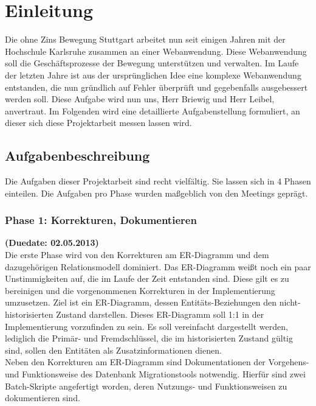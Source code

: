 \documentclass[12pt,             %
               a4paper,          %
               listof=totoc,     %
               index=totoc,      %
               bibliography=totoc,%
               oneside,         %
               BCOR1cm,          %
               english   %
               ]{scrbook}
\begin{document}
\chapter{Einleitung}
Die ohne Zins Bewegung Stuttgart arbeitet nun seit einigen Jahren mit der Hochschule Karlsruhe zusammen an einer Webanwendung. Diese Webanwendung soll die Geschäftsprozesse der Bewegung unterstützen und verwalten. Im Laufe der letzten Jahre ist aus der ursprünglichen Idee eine komplexe Webanwendung entstanden, die nun gründlich auf Fehler überprüft und gegebenfalls ausgebessert werden soll. 
Diese Aufgabe wird nun uns, Herr Briewig und Herr Leibel, anvertraut. Im Folgenden wird eine detaillierte Aufgabenstellung formuliert, an dieser sich diese Projektarbeit messen lassen wird.  

\section{Aufgabenbeschreibung}
Die Aufgaben dieser Projektarbeit sind recht vielfältig. Sie lassen sich in 4 Phasen einteilen. Die Aufgaben pro Phase wurden maßgeblich von den Meetings geprägt.

\subsection{Phase 1: Korrekturen, Dokumentieren}
\textbf {(Duedate: 02.05.2013)}\\
Die erste Phase wird von den Korrekturen am ER-Diagramm und dem dazugehörigen Relationsmodell dominiert. Das ER-Diagramm weißt noch ein paar Unstimmigkeiten auf, die im Laufe der Zeit entstanden sind. Diese gilt es zu bereinigen und die vorgenommenen Korrekturen in der Implementierung umzusetzen. Ziel ist ein ER-Diagramm, dessen Entitäts-Beziehungen den nicht-historisierten Zustand darstellen. Dieses ER-Diagramm soll 1:1 in der Implementierung vorzufinden zu sein. Es soll vereinfacht dargestellt werden, lediglich die Primär- und Fremdschlüssel, die im historisierten Zustand gültig sind, sollen den Entitäten als Zusatzinformationen dienen.\\

Neben den Korrekturen am ER-Diagramm sind Dokumentationen der Vorgehens- und Funktionsweise des Datenbank Migrationstools notwendig. Hierfür sind zwei Batch-Skripte angefertigt worden, deren Nutzungs- und Funktionsweisen zu dokumentieren sind.\\
\end{document}
